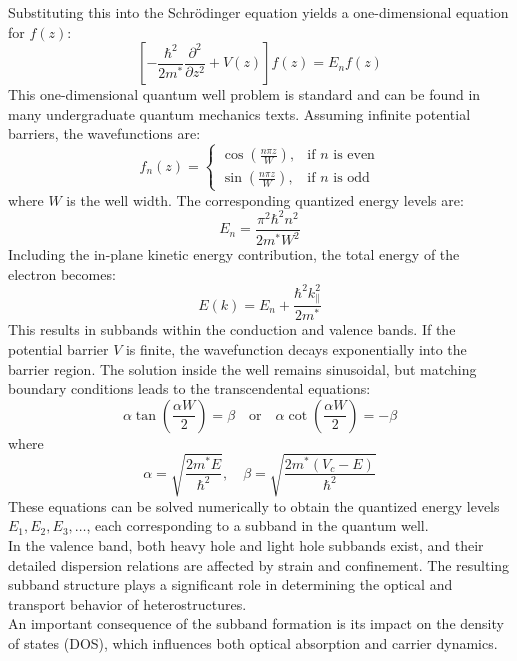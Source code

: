 Substituting this into the Schrödinger equation yields a one-dimensional equation for \( f(z) \):
\begin{equation}
	\left[-\frac{\hbar^2}{2 m^*} \frac{\partial^2}{\partial z^2} + V(z) \right] f(z) = E_n f(z)
\end{equation}
This one-dimensional quantum well problem is standard and can be found in many undergraduate quantum mechanics texts. Assuming infinite potential barriers, the wavefunctions are:
\[
	f_n(z) =
	\begin{cases}
		\cos\left( \frac{n \pi z}{W} \right), & \text{if } n \text{ is even} \\
		\sin\left( \frac{n \pi z}{W} \right), & \text{if } n \text{ is odd}
	\end{cases}
\]
where \( W \) is the well width. The corresponding quantized energy levels are:
\begin{equation}
	E_n = \frac{\pi^2 \hbar^2 n^2}{2 m^* W^2}
\end{equation}
Including the in-plane kinetic energy contribution, the total energy of the electron becomes:
\begin{equation}
	E(k) = E_n + \frac{\hbar^2 k_\parallel^2}{2 m^*}
\end{equation}
This results in subbands within the conduction and valence bands. If the potential barrier \( V \) is finite, the wavefunction decays exponentially into the barrier region. The solution inside the well remains sinusoidal, but matching boundary conditions leads to the transcendental equations:
\begin{equation}
	\alpha \tan\left( \frac{\alpha W}{2} \right) = \beta \quad \text{or} \quad \alpha \cot\left( \frac{\alpha W}{2} \right) = -\beta
\end{equation}
where
\begin{equation}
	\alpha = \sqrt{\frac{2 m^* E}{\hbar^2}}, \quad \beta = \sqrt{\frac{2 m^* (V_c - E)}{\hbar^2}}
\end{equation}
These equations can be solved numerically to obtain the quantized energy levels \( E_1, E_2, E_3, \dots \), each corresponding to a subband in the quantum well.\\
In the valence band, both heavy hole and light hole subbands exist, and their detailed dispersion relations are affected by strain and confinement. The resulting subband structure plays a significant role in determining the optical and transport behavior of heterostructures.\\
An important consequence of the subband formation is its impact on the density of states (DOS), which influences both optical absorption and carrier dynamics.

